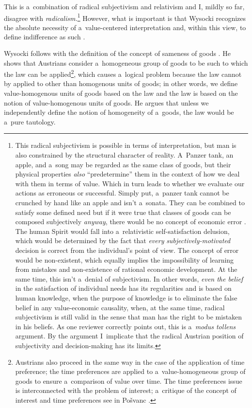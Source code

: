 This is a~combination of radical subjectivism and relativism and I, mildly so far, disagree with \textit{radicalism.}\footnote{This radical subjectivism is possible in terms of interpretation, but man is also constrained by the structural character of reality. A~Panzer tank, an apple, and a~song may be regarded as the same class of goods, but their physical properties \textit{also} ``predetermine'' them in the context of how we deal with them in terms of value. Which in turn leads to whether we evaluate our actions as erroneous or successful. Simply put, a~panzer tank cannot be crunched by hand like an apple and isn't a~sonata. They can be combined to satisfy some defined need but if it were true that classes of goods can be composed subjectively \textit{anyway}, there would be no concept of economic error 
\parencite[see][]{}. %
 The human Spirit would fall into a~relativistic self-satisfaction delusion, which would be determined by the fact that \textit{every} \textit{subjectively-motivated} decision is correct from the individual's point of view. The concept of error would be non-existent, which equally implies the impossibility of learning from mistakes and non-existence of rational economic development. At the same time, this isn't a~denial of subjectivism. In other words, \textit{even the belief} in the satisfaction of individual needs has its regularities and is based on human knowledge, when the purpose of knowledge is to eliminate the false belief in any value-economic causality, when, at the same time, radical subjectivism is still valid in the sense that man has the right to be mistaken in his beliefs. As one reviewer correctly points out, this is a~\textit{modus tollens} argument. By the argument I~implicate that the radical Austrian position of subjectivity and decision-making has its limits. } However, what is important is that Wysocki recognizes the absolute necessity of a~value-centered interpretation and, within this view, to define indifference as such 
\parencite[see also][]{}.%




Wysocki follows with the definition of the concept of sameness of goods 
\parencite[][pp.16]{}. %
 He shows that Austrians consider a~homogeneous group of goods to be such to which the law can be applied\footnote{Austrians also proceed in the same way in the case of the application of time preference; the time preferences are applied to a~value-homogeneous group of goods to ensure a~comparison of value over time. The time preferences issue is interconnected with the problem of interest; a~critique of the concept of interest and time preferences see in Pošvanc 
\parencite*[][]{}.%
}, which causes a~logical problem because the law cannot by applied to other than homogenous units of goods; in other words, we define value-homogenous units of goods based on the law and the law is based on the notion of value-homogenous units of goods. He argues that unless we independently define the notion of homogeneity of a~goods, the law would be a~pure tautology.



